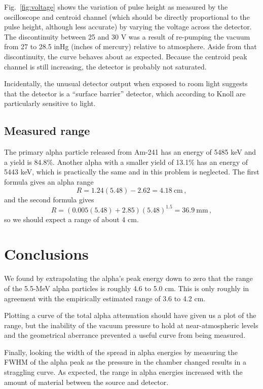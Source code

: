 \documentclass{anstrans}
\newcommand{\units}[1] {\:\text{#1}}%
\begin{document}
Fig.~\ref{fig:voltage} shows the variation of pulse height as measured by the
oscilloscope and centroid channel (which should be directly proportional to the
pulse height, although less accurate) by varying the voltage across the
detector.
The discontinuity between 25 and 30 V was a result of re-pumping the vacuum
from 27 to 28.5 inHg (inches of mercury) relative to atmosphere. Aside from
that discontinuity, the curve behaves about as expected. Because the centroid
peak channel is still increasing, the detector is probably not saturated.

Incidentally, the unusual detector output when exposed to room light suggests
that the detector is a ``surface barrier'' detector, which according to Knoll
\cite[p.~377]{kno2000} are particularly sensitive to light.

\subsection{Measured range}
The primary alpha particle released from Am-241 has an energy of 5485 keV
and a yield is 84.8\%. Another alpha with a smaller yield of 13.1\% has an
energy of 5443 keV, which is practically the same and in this problem is
neglected. The first formula gives an alpha range
$$ R = 1.24 (5.48) - 2.62 = 4.18 \units{cm}\,,$$
and the second formula gives
$$ R = (0.005 (5.48) + 2.85) (5.48)^{1.5} = 36.9 \units{mm} \,,$$
so we should expect a range of about 4 cm.
\section{Conclusions}

We found by extrapolating the alpha's peak energy down to zero that the range
of the 5.5-MeV alpha particles is roughly 4.6 to 5.0 cm. This is only roughly
in agreement with the empirically estimated range of 3.6 to 4.2 cm.

Plotting a curve of the total alpha attenuation
should have given us a plot of the range, but the inability of the vacuum
pressure to hold at near-atmospheric levels and the geometrical aberrance
prevented a useful curve from being measured.

Finally, looking the width of the spread in alpha energies by measuring the
FWHM of the alpha peak as the pressure in the chamber changed results in a
straggling curve. As expected, the range in alpha energies increased with the
amount of material between the source and detector.
\end{document}
